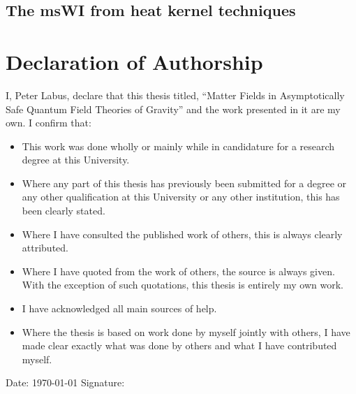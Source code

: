 \documentclass[11pt]{book}
\numberwithin{equation}{chapter}
\begin{document}
\begin{appendices}
\chapter{The msWI from heat kernel techniques}
\label{app:msWI}

\end{appendices}


\chapter*{Declaration of Authorship}

\noindent I, Peter Labus, declare that this thesis titled,
``Matter Fields in Asymptotically Safe Quantum Field Theories of Gravity''
and the work presented in it are my own. I confirm that:
\vfill

\begin{itemize}
\item This work was done wholly or mainly while in candidature for a research degree at this University.
\vfill
\item Where any part of this thesis has previously been submitted for a degree or any other qualification at this University or any other institution, this has been clearly stated.
\vfill
\item Where I have consulted the published work of others, this is always clearly attributed.
\vfill
\item Where I have quoted from the work of others, the source is always given. With the exception of such quotations, this thesis is entirely my own work.
\vfill
\item I have acknowledged all main sources of help.
\vfill
\item Where the thesis is based on work done by myself jointly with others,
  I have made clear exactly what was done by others and what I have contributed myself.
\end{itemize}
\vfill

\noindent Date: \dateall\today%
\hspace{4cm} Signature:\\
\end{document}
